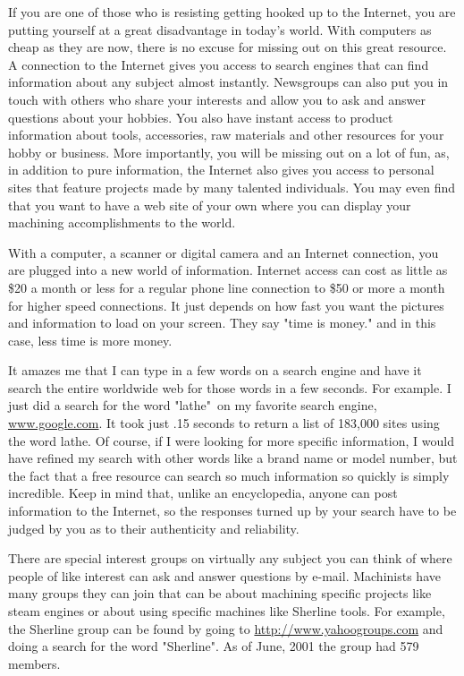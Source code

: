 If you are one of those who is resisting getting hooked up to the Internet, you
are putting yourself at a great disadvantage in today's world. With computers as
cheap as they are now, there is no excuse for missing out on this great
resource. A connection to the Internet gives you access to search engines that
can find information about any subject almost instantly. Newsgroups can also put
you in touch with others who share your interests and allow you to ask and
answer questions about your hobbies. You also have instant access to product
information about tools, accessories, raw materials and other resources for your
hobby or business. More importantly, you will be missing out on a lot of fun,
as, in addition to pure information, the Internet also gives you access to
personal sites that feature projects made by many talented individuals. You may
even find that you want to have a web site of your own where you can display
your machining accomplishments to the world.

With a computer, a scanner or digital camera and an Internet connection, you are
plugged into a new world of information. Internet access can cost as little as
\$20 a month or less for a regular phone line connection to \$50 or more a month
for higher speed connections. It just depends on how fast you want the pictures
and information to load on your screen. They say "time is money." and in this
case, less time is more money.


It amazes me that I can type in a few words on a search engine and have it
search the entire worldwide web for those words in a few seconds. For example. I
just did a search for the word "lathe"\ on my favorite search engine,
\url{www.google.com}. It took just .15 seconds to return a list of 183,000 sites
using the word lathe. Of course, if I were looking for more specific
information, I would have refined my search with other words like a brand name
or model number, but the fact that a free resource can search so much
information so quickly is simply incredible. Keep in mind that, unlike an
encyclopedia, anyone can post information to the Internet, so the responses
turned up by your search have to be judged by you as to their authenticity and
reliability.


There are special interest groups on virtually any subject you can think of
where people of like interest can ask and answer questions by e-mail. Machinists
have many groups they can join that can be about machining specific projects
like steam engines or about using specific machines like Sherline tools. For
example, the Sherline group can be found by going to
\url{http://www.yahoogroups.com} and doing a search for the word "Sherline". As
of June, 2001 the group had 579 members.

